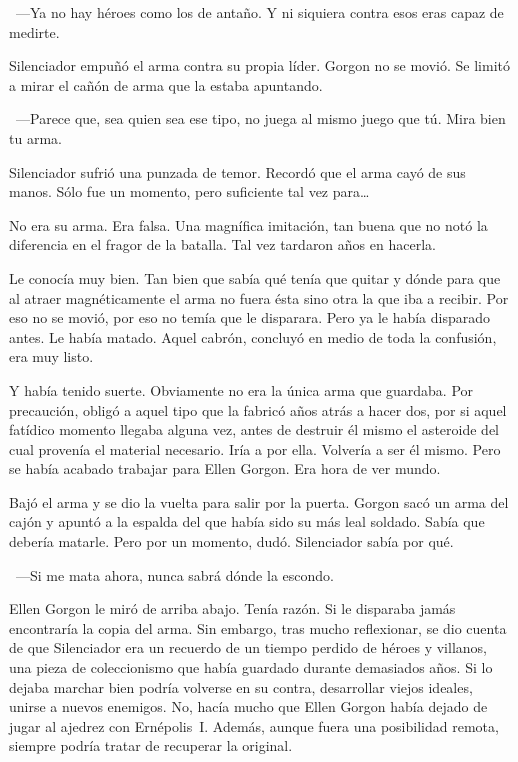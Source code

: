 ~---Ya no hay héroes como los de antaño. Y ni siquiera contra esos eras capaz de medirte.

Silenciador empuñó el arma contra su propia líder. Gorgon no se movió. Se limitó a mirar el cañón de arma que la estaba apuntando.

~---Parece que, sea quien sea ese tipo, no juega al mismo juego que tú. Mira bien tu arma.

Silenciador sufrió una punzada de temor. Recordó que el arma cayó de sus manos. Sólo fue un momento, pero suficiente tal vez para\dots

No era su arma. Era falsa. Una magnífica imitación, tan buena que no notó la diferencia en el fragor de la batalla. Tal vez tardaron años en hacerla.

Le conocía muy bien. Tan bien que sabía qué tenía que quitar y dónde para que al atraer magnéticamente el arma no fuera ésta sino otra la que iba a recibir. Por eso no se movió, por eso no temía que le disparara. Pero ya le había disparado antes. Le había matado. Aquel cabrón, concluyó en medio de toda la confusión, era muy listo.

Y había tenido suerte. Obviamente no era la única arma que guardaba. Por precaución, obligó a aquel tipo que la fabricó años atrás a hacer dos, por si aquel fatídico momento llegaba alguna vez, antes de destruir él mismo el asteroide del cual provenía el material necesario. Iría a por ella. Volvería a ser él mismo. Pero se había acabado trabajar para Ellen Gorgon. Era hora de ver mundo.

Bajó el arma y se dio la vuelta para salir por la puerta. Gorgon sacó un arma del cajón y apuntó a la espalda del que había sido su más leal soldado. Sabía que debería matarle. Pero por un momento, dudó. Silenciador sabía por qué.

~---Si me mata ahora, nunca sabrá dónde la escondo.

Ellen Gorgon le miró de arriba abajo. Tenía razón. Si le disparaba jamás encontraría la copia del arma. Sin embargo, tras mucho reflexionar, se dio cuenta de que Silenciador era un recuerdo de un tiempo perdido de héroes y villanos, una pieza de coleccionismo que había guardado durante demasiados años. Si lo dejaba marchar bien podría volverse en su contra, desarrollar viejos ideales, unirse a nuevos enemigos. No, hacía mucho que Ellen Gorgon había dejado de jugar al ajedrez con Ernépolis~I. Además, aunque fuera una posibilidad remota, siempre podría tratar de recuperar la original.

